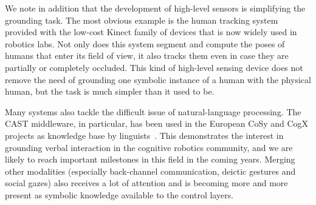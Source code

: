 \documentclass[journal]{IEEEtran}
\begin{document}
We note in addition that the development of high-level sensors is simplifying
the grounding task. The most obvious example is the human tracking system
provided with the low-cost Kinect family of devices that is now widely used
in robotics labs. Not only does this system segment and compute the poses of 
humans that enter its field of view, it also tracks them even in case they 
are partially or completely occluded. This kind of high-level sensing device 
does not remove the need of grounding one symbolic instance of a human with 
the physical human, but the task is much simpler than it used to be.

Many systems also tackle the difficult issue of natural-language processing.
The CAST middleware, in particular, has been used in the European CoSy and CogX
projects as knowledge base by linguists~\cite{Kruijff2010a}. This demonstrates
the interest in grounding verbal interaction in the cognitive robotics community, 
and we are likely to reach important milestones in this field in the coming years.
Merging other modalities (especially back-channel communication, deictic
gestures and social gazes) also receives a lot of attention and is becoming more
and more present as symbolic knowledge available to the control layers.
\end{document}
